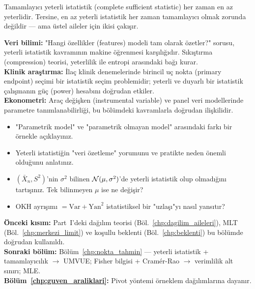 \begin{hocanotu}
Tamamlayıcı yeterli istatistik (complete sufficient statistic) her zaman en az yeterlidir.
Tersine, en az yeterli istatistik her zaman tamamlayıcı olmak zorunda değildir ---
ama üstel aileler için ikisi çakışır.
\end{hocanotu}

\begin{kopru}
\textbf{Veri bilimi:} "Hangi özellikler (features) modeli tam olarak özetler?" sorusu,
yeterli istatistik kavramının makine öğrenmesi karşılığıdır.
Sıkıştırma (compression) teorisi, yeterlilik ile entropi arasındaki bağı kurar.\\
\textbf{Klinik araştırma:} İlaç klinik denemelerinde birincil uç nokta (primary endpoint)
seçimi bir istatistik seçim problemidir; yeterli ve duyarlı bir istatistik
çalışmanın güç (power) hesabını doğrudan etkiler.\\
\textbf{Ekonometri:} Araç değişken (instrumental variable) ve panel veri modellerinde
parametre tanımlanabilirliği, bu bölümdeki kavramlarla doğrudan ilişkilidir.
\end{kopru}

\begin{ozyansima}
\begin{itemize}
  \item "Parametrik model" ve "parametrik olmayan model" arasındaki farkı bir örnekle açıklayınız.
  \item Yeterli istatistiğin "veri özetleme" yorumunu ve pratikte neden önemli olduğunu anlatınız.
  \item $(\bar{X}_n, S^2)$'nin $\sigma^2$ bilinen $\mathcal{N}(\mu,\sigma^2)$'de yeterli istatistik olup
        olmadığını tartışınız. Tek bilinmeyen $\mu$ ise ne değişir?
  \item OKH ayrışımı $= \mathrm{Var} + \mathrm{Yan}^2$ istatistiksel bir "uzlaşı"yı nasıl yansıtır?
\end{itemize}
\end{ozyansima}

\begin{kopru}
\textbf{Önceki kısım:} Part~I'deki dağılım teorisi (Böl.~\ref{chp:dagilim_aileleri}),
MLT (Böl.~\ref{chp:merkezi_limit}) ve koşullu beklenti (Böl.~\ref{chp:beklenti})
bu bölümde doğrudan kullanıldı.\\
\textbf{Sonraki bölüm:} Bölüm~\ref{chp:nokta_tahmin} --- yeterli istatistik + tamamlayıcılık
$\to$ UMVUE; Fisher bilgisi + Cramér-Rao $\to$ verimlilik alt sınırı; MLE.\\
\textbf{Bölüm~\ref{chp:guven_araliklari}:} Pivot yöntemi örneklem dağılımlarına dayanır.
\end{kopru}

